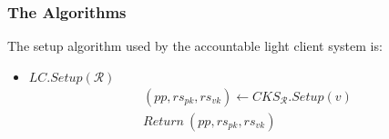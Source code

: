 
\subsubsection{The Algorithms}
\label{sec:instantiation}

\noindent The setup algorithm used by the accountable light client system is: 
\begin{itemize}
\item $\mathit{LC.Setup(\mathcal{R})}$
\begin{align*}
(\mathit{pp}, \mathit{rs_{\mathit{pk}}}, \mathit{rs_{\mathit{vk}}}) \leftarrow \mathit{CKS_{\mathcal{R}}.Setup}(v) \\ 
\mathit{Return} \ (\mathit{pp}, \mathit{rs_{\mathit{pk}}}, \mathit{rs_{\mathit{vk}}})
\end{align*}
\end{itemize}

